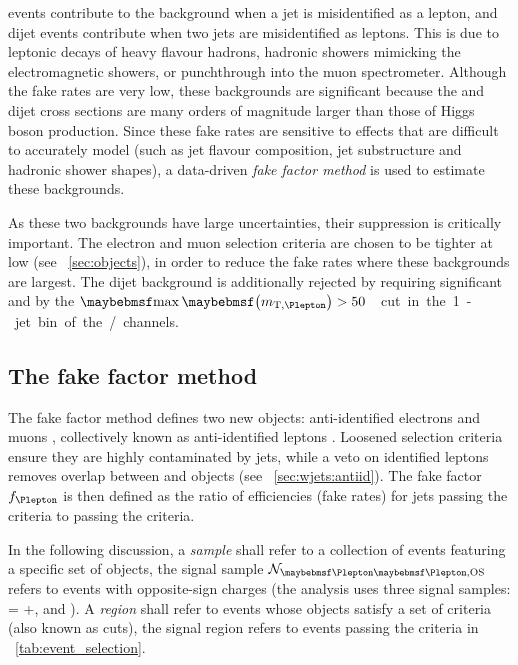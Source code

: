 
\Wjets events contribute to the background when a jet is misidentified as a lepton, and 
dijet events contribute when two jets are misidentified as leptons. This is due to leptonic 
decays of heavy flavour hadrons, hadronic showers mimicking the electromagnetic showers, or 
punchthrough into the muon spectrometer. Although the fake rates are very low, these 
backgrounds are significant because the \Wjets and dijet cross sections are many orders of 
magnitude larger than those of Higgs boson production. Since these fake rates are sensitive 
to effects that are difficult to accurately model (such as jet flavour composition, jet 
substructure and hadronic shower shapes), a data-driven \textit{fake factor method} is used 
to estimate these backgrounds.

As these two backgrounds have large uncertainties, their suppression is critically 
important. The electron and muon selection criteria are chosen to be tighter at low \pt 
(see \Section~\ref{sec:objects}), in order to reduce the fake rates where these backgrounds 
are largest. The dijet background is additionally rejected by requiring significant \met 
and by the \unit{$\maxmtw > 50$}{\GeV} cut in the 1-jet bin of the \emch/\mech channels.



\subsection{The fake factor method}
\label{sec:wjets:fakefactor_method}

The fake factor method defines two new objects: anti-identified electrons \antiid{\Pe} and 
muons \antiid{\Pmu}, collectively known as anti-identified leptons \antiid{\Plepton}. 
Loosened selection criteria ensure they are highly contaminated by jets, while a veto on 
identified leptons \id{\Plepton} removes overlap between \id{\Plepton} and \antiid{\Plepton}
objects (see \Section~\ref{sec:wjets:antiid}). The fake factor $f_{\Plepton}$ is then 
defined as the ratio of efficiencies (\ie fake rates) for jets passing the \id{\Plepton} 
criteria to passing the \antiid{\Plepton} criteria.

In the following discussion, a \textit{sample} shall refer to a collection of events 
featuring a specific set of objects, \eg the signal sample 
$\mathcal{N}_{\id{\Plepton}\id{\Plepton}\text{,OS}}$ refers to \id{\Plepton}\id{\Plepton} 
events with opposite-sign charges (the \HWW analysis uses three signal samples: 
\id{\Plepton}\id{\Plepton} = \eech{}+\mmch, \emch and \mech). A \textit{region} shall refer 
to events whose objects satisfy a set of criteria (also known as cuts), \eg the signal 
region refers to events passing the criteria in \Table~\ref{tab:event_selection}.

